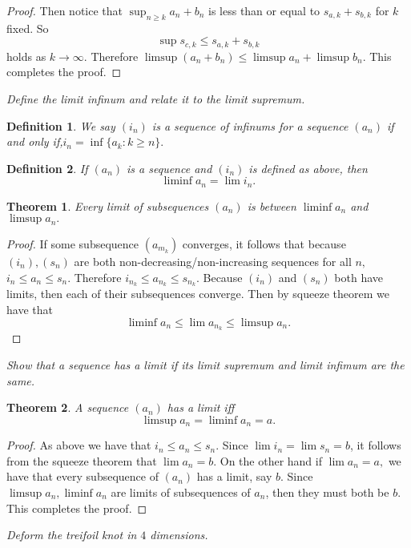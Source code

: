 \documentclass[letter]{article}
\newtheorem{theorem}{Theorem}
\newtheorem{definition}{Definition}
\newenvironment{menumerate}{%
  \edef\backupindent{\the\parindent}%
  \enumerate%
  \setlength{\parindent}{\backupindent}%
}{\endenumerate}
\begin{document}
\begin{menumerate}
\begin{menumerate}
\begin{proof}
			    Then notice that $\sup_{n\geq k} a_n +b_n$ is less than or
			    equal to $  s_{a,k} + s_{b,k}$ for $k$ fixed. 
			    So
			    \begin{equation}
			    \sup s_{c,k} \leq  s_{a,k} +  s_{b,k}
			    \end{equation}
			    holds as $k\to \infty$. Therefore $\limsup{(a_n + b_n)} \leq \limsup{a_n} + \limsup{b_n}$.
			    This completes the proof.
			    \end{proof}
				\newpage
			\item \textit{Define the limit infinum and relate it to the limit supremum.}
				\begin{definition} We say $(i_{n})$ is a sequence of infinums for a sequence $(a_n)$ if and only if,$ i_n = \inf\{a_k : k \geq n\}.$ 
	 			\end{definition}
	 			\begin{definition} If $(a_n)$ is a sequence and $(i_n)$ is defined as above, then
	 			$$\liminf a_n = \lim i_n.$$
	 			\end{definition}

	 			\begin{theorem}
	 				Every limit of subsequences $(a_n)$ is between $\liminf a_n$ and $\limsup a_n.$
	 			\end{theorem}
	 			\begin{proof}
	 				If some subsequence $(a_{m_k})$ converges, it follows that because $(i_n), (s_n)$ are both non-decreasing/non-increasing sequences for all $n,$ $i_n \leq a_n \leq s_n.$ Therefore $i_{n_k} \leq a_{n_k} \leq s_{n_k}.$ Because $(i_n)$ and $(s_n)$ both have limits, then each of their subsequences converge. Then by squeeze theorem we have that $$\liminf a_n \leq \lim a_{n_k} \leq \limsup {a_n}.$$ 
	 			\end{proof}


			\item \textit{Show that a sequence has a limit if its limit supremum and limit infimum are the same.}
				\begin{theorem}
				 	A sequence $(a_n)$ has a limit iff $$\limsup a_n = \liminf a_n = a.$$
				 \end{theorem} 
			 	\begin{proof}
			 	 As above we have that $i_n \leq a_n \leq s_n.$ Since $\lim i_n = \lim s_n = b$, it follows from the squeeze theorem that $\lim a_n = b.$
			 	 On the other hand if $\lim a_n = a,$ we have that every subsequence of $(a_n)$ has a limit, say $b$. Since $\limsup a_n, \liminf a_n$ are limits of subsequences of $a_n$, then they must both be $b.$ This completes the proof.
			 	\end{proof}
			\end{menumerate} 

			\newpage
			\setcounter{enumi}{47}
			\item \textit{Deform the treifoil knot in $4$ dimensions.} 



		
		
\end{menumerate}
\end{document}
